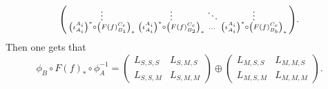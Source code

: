 \begin{remark}
\[\begin{psmallmatrix}
            \vdots & \vdots & \ddots & \vdots \\
            \left(  \iota_{A_i}^{A_i}  \right)^* \circ \left(  F(f)_{B_1}^{C_c}  \right)_* &
            \left(  \iota_{A_i}^{A_i}  \right)^* \circ \left(  F(f)_{B_2}^{C_c}  \right)_* &
            \dots &
            \left(  \iota_{A_i}^{A_i}  \right)^* \circ \left(  F(f)_{B_b}^{C_c}  \right)_* \\
        \end{psmallmatrix}.
    \]
    Then one gets that
    \[
        \phi_B \circ F(f)_* \circ \phi_A^{-1} =
        \begin{pmatrix}
            L_{S, S, S} & L_{S, M, S} \\
            L_{S, S, M } & L_{S, M, M}
        \end{pmatrix}
        \oplus
        \begin{pmatrix}
            L_{M, S, S} & L_{M, M, S} \\
            L_{M, S, M} & L_{M, M, M}
        \end{pmatrix}.
    \]
    



\end{remark}
